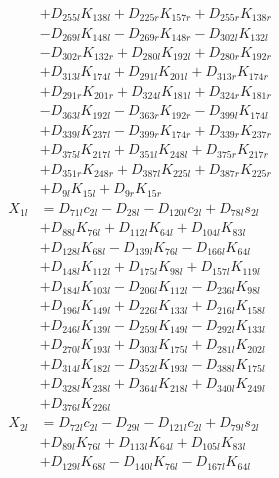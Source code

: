 \begin{multicols}{2}
\begin{align}
&+ D_{255l}K_{138l} + D_{225r}K_{157r} + D_{255r}K_{138r}  \nonumber \\
&- D_{269l}K_{148l} - D_{269r}K_{148r} - D_{302l}K_{132l}  \nonumber \\
&- D_{302r}K_{132r} + D_{280l}K_{192l} + D_{280r}K_{192r}  \nonumber \\
&+ D_{313l}K_{174l} + D_{291l}K_{201l} + D_{313r}K_{174r}  \nonumber \\
&+ D_{291r}K_{201r} + D_{324l}K_{181l} + D_{324r}K_{181r}  \nonumber \\
&- D_{363l}K_{192l} - D_{363r}K_{192r} - D_{399l}K_{174l}  \nonumber \\
&+ D_{339l}K_{237l} - D_{399r}K_{174r} + D_{339r}K_{237r}  \nonumber \\
&+ D_{375l}K_{217l} + D_{351l}K_{248l} + D_{375r}K_{217r}  \nonumber \\
&+ D_{351r}K_{248r} + D_{387l}K_{225l} + D_{387r}K_{225r}  \nonumber \\
&+ D_{9l}K_{15l} + D_{9r}K_{15r} \nonumber \\
X_{1l} &= D_{71l}c_{2l} - D_{28l} - D_{120l}c_{2l} + D_{78l}s_{2l}  \nonumber \\
&+ D_{88l}K_{76l} + D_{112l}K_{64l} + D_{104l}K_{83l}  \nonumber \\
&+ D_{128l}K_{68l} - D_{139l}K_{76l} - D_{166l}K_{64l}  \nonumber \\
&+ D_{148l}K_{112l} + D_{175l}K_{98l} + D_{157l}K_{119l}  \nonumber \\
&+ D_{184l}K_{103l} - D_{206l}K_{112l} - D_{236l}K_{98l}  \nonumber \\
&+ D_{196l}K_{149l} + D_{226l}K_{133l} + D_{216l}K_{158l}  \nonumber \\
&+ D_{246l}K_{139l} - D_{259l}K_{149l} - D_{292l}K_{133l}  \nonumber \\
&+ D_{270l}K_{193l} + D_{303l}K_{175l} + D_{281l}K_{202l}  \nonumber \\
&+ D_{314l}K_{182l} - D_{352l}K_{193l} - D_{388l}K_{175l}  \nonumber \\
&+ D_{328l}K_{238l} + D_{364l}K_{218l} + D_{340l}K_{249l}  \nonumber \\
&+ D_{376l}K_{226l} \nonumber \\
X_{2l} &= D_{72l}c_{2l} - D_{29l} - D_{121l}c_{2l} + D_{79l}s_{2l}  \nonumber \\
&+ D_{89l}K_{76l} + D_{113l}K_{64l} + D_{105l}K_{83l}  \nonumber \\
&+ D_{129l}K_{68l} - D_{140l}K_{76l} - D_{167l}K_{64l}  \nonumber \\

\end{align}
\end{multicols}
